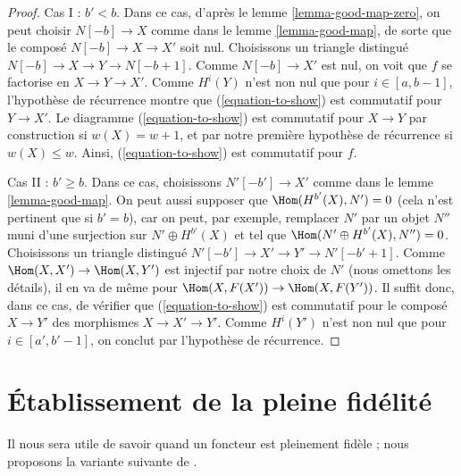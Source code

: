 \begin{proof}
\medskip\noindent
Cas I : $b' < b$. Dans ce cas, d'après le lemme \ref{lemma-good-map-zero},
on peut choisir $N[-b] \to X$ comme dans le lemme \ref{lemma-good-map},
de sorte que le composé $N[-b] \to X \to X'$ soit nul.
Choisissons un triangle distingué $N[-b] \to X \to Y \to N[-b + 1]$. Comme
$N[-b] \to X'$ est nul, on voit que $f$ se factorise
en $X \to Y \to X'$. Comme $H^i(Y)$ n'est non nul que pour $i \in [a, b - 1]$,
l'hypothèse de récurrence montre que (\ref{equation-to-show}) est commutatif pour
$Y \to X'$. Le diagramme (\ref{equation-to-show}) est commutatif pour
$X \to Y$ par construction si $w(X) = w + 1$, et par notre première
hypothèse de récurrence si $w(X) \leq w$.
Ainsi, (\ref{equation-to-show}) est commutatif pour $f$.

\medskip\noindent
Cas II : $b' \geq b$. Dans ce cas, choisissons $N'[-b'] \to X'$
comme dans le lemme \ref{lemma-good-map}.
On peut aussi supposer que $\Hom(H^{b'}(X), N') = 0$ (cela n'est
pertinent que si $b' = b$), car on peut, par exemple,
remplacer $N'$ par un objet $N''$ muni d'une surjection sur $N' \oplus H^{b'}(X)$
et tel que $\Hom(N' \oplus H^{b'}(X), N'') = 0$.
Choisissons un triangle distingué
$N'[-b'] \to X' \to Y' \to N'[-b' + 1]$. Comme
$\Hom(X, X') \to \Hom(X, Y')$ est injectif par notre choix de $N'$
(nous omettons les détails), il en va de même pour
$\Hom(X, F(X')) \to \Hom(X, F(Y'))$.
Il suffit donc, dans ce cas, de vérifier que
(\ref{equation-to-show}) est commutatif pour le composé $X \to Y'$
des morphismes $X \to X' \to Y'$.
Comme $H^i(Y')$ n'est non nul que pour $i \in [a', b' - 1]$,
on conclut par l'hypothèse de récurrence.
\end{proof}










\section{Établissement de la pleine fidélité}
\label{section-get-fully-faithful}

\noindent
Il nous sera utile de savoir quand un foncteur est pleinement fidèle ;
nous proposons la variante suivante de \cite[Lemma 2.15]{Orlov-K3}.

